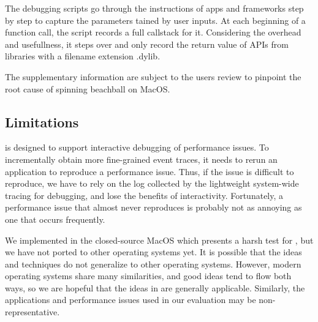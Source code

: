 The debugging scripts go through the instructions of apps and frameworks step
by step to capture the parameters tained by user inputs. At each beginning of
a function call, the script records a full callstack for it. Considering the
overhead and usefullness, it steps over and only record the return value of APIs
from libraries with a filename extension .dylib.

The supplementary information are subject to the users review to pinpoint the
root cause of spinning beachball on MacOS.

\subsection{Limitations}
\xxx is designed to support interactive debugging of performance issues. To
incrementally obtain more fine-grained event traces, it needs to rerun an
application to reproduce a performance issue. Thus, if the issue is difficult to
reproduce, we have to rely on the log collected by the lightweight system-wide
tracing for debugging, and lose the benefits of interactivity. Fortunately, a
performance issue that almost never reproduces is probably not as annoying as
one that occurs frequently.

We implemented \xxx in the closed-source MacOS which presents a harsh test
for \xxx, but we have not ported \xxx to other operating systems yet. It is
possible that the ideas and techniques do not generalize to other operating
systems. However, modern operating systems share many similarities, and good
ideas tend to flow both ways, so we are hopeful that the ideas in \xxx are
generally applicable. Similarly, the applications and performance issues used in
our evaluation may be non-representative.
